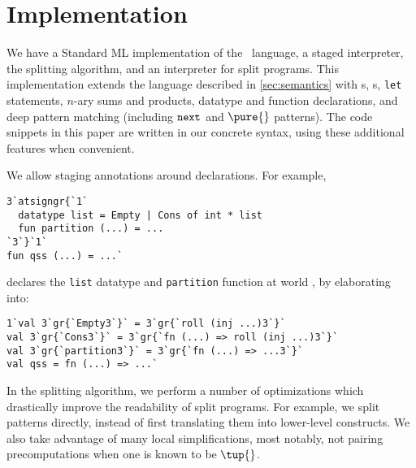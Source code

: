 
\section {Implementation}
\label{sec:implementation}

\begin{abstrsyn}
We have a Standard ML implementation of the \lang\ language, a staged
interpreter, the splitting algorithm, and an interpreter for split programs.
This implementation extends the language described in \ref{sec:semantics} with 
\rmint{}s,
\rmbool{}s,
\texttt{let} statements,
$n$-ary sums and products,
datatype and function declarations, and
deep pattern matching (including ${\tt next}{}$ and $\pure{}$ patterns).
The code snippets in this paper are written in our concrete syntax, using 
these additional features when convenient.

We allow staging annotations around declarations. For example,
\begin{lstlisting}
3`atsigngr{`1`
  datatype list = Empty | Cons of int * list
  fun partition (...) = ...
`3`}`1`
fun qss (...) = ...`
\end{lstlisting}
declares the \texttt{list} datatype and \texttt{partition} function at world \bbonep,
by elaborating into:
\begin{lstlisting}
1`val 3`gr{`Empty3`}` = 3`gr{`roll (inj ...)3`}`
val 3`gr{`Cons3`}` = 3`gr{`fn (...) => roll (inj ...)3`}`
val 3`gr{`partition3`}` = 3`gr{`fn (...) => ...3`}`
val qss = fn (...) => ...`
\end{lstlisting}

In the splitting algorithm, we perform a number of optimizations which
drastically improve the readability of split programs. For example, we split
patterns directly, instead of first translating them into lower-level
constructs. We also take advantage of many local simplifications, most notably,
not pairing precomputations when one is known to be $\tup{}$.




\end{abstrsyn}
